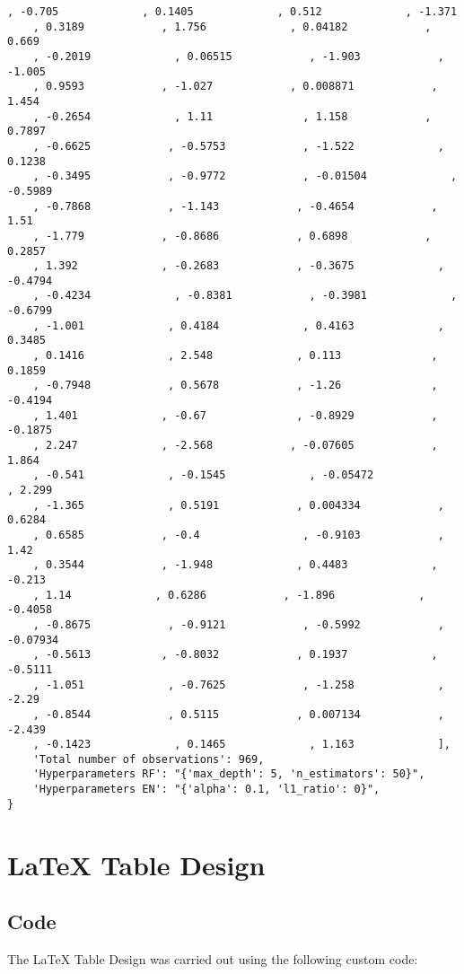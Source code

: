 \documentclass[11pt]{article}
\begin{document}
\begin{Verbatim}[tabsize=4]
	, -0.705             , 0.1405             , 0.512             , -1.371
	, 0.3189            , 1.756             , 0.04182            , 0.669
	, -0.2019             , 0.06515            , -1.903            , -1.005
	, 0.9593            , -1.027            , 0.008871            , 1.454
	, -0.2654             , 1.11              , 1.158            , 0.7897
	, -0.6625            , -0.5753            , -1.522             , 0.1238
	, -0.3495            , -0.9772            , -0.01504             , -0.5989
	, -0.7868            , -1.143            , -0.4654            , 1.51
	, -1.779            , -0.8686            , 0.6898            , 0.2857
	, 1.392             , -0.2683            , -0.3675             , -0.4794
	, -0.4234             , -0.8381            , -0.3981             , -0.6799
	, -1.001             , 0.4184             , 0.4163             , 0.3485
	, 0.1416             , 2.548             , 0.113              , 0.1859
	, -0.7948            , 0.5678            , -1.26              , -0.4194
	, 1.401             , -0.67              , -0.8929            , -0.1875
	, 2.247             , -2.568            , -0.07605            , 1.864
	, -0.541             , -0.1545             , -0.05472             , 2.299
	, -1.365             , 0.5191            , 0.004334            , 0.6284
	, 0.6585            , -0.4                , -0.9103            , 1.42
	, 0.3544            , -1.948             , 0.4483             , -0.213
	, 1.14             , 0.6286            , -1.896             , -0.4058
	, -0.8675            , -0.9121            , -0.5992            , -0.07934
	, -0.5613           , -0.8032            , 0.1937             , -0.5111
	, -1.051             , -0.7625            , -1.258             , -2.29
	, -0.8544            , 0.5115            , 0.007134            , -2.439
	, -0.1423             , 0.1465             , 1.163             ],
    'Total number of observations': 969,
    'Hyperparameters RF': "{'max_depth': 5, 'n_estimators': 50}",
    'Hyperparameters EN': "{'alpha': 0.1, 'l1_ratio': 0}",
}
\end{Verbatim}

\section{LaTeX Table Design}
\subsection{{Code}}
The LaTeX Table Design was carried out using the following custom code:
\end{document}
